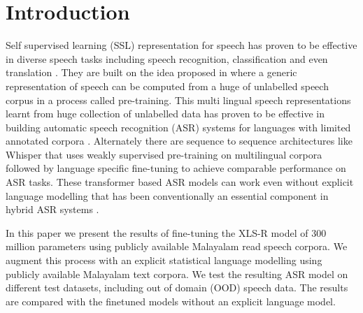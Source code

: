 \documentclass[runningheads]{llncs}
\begin{document}
\section{Introduction}

Self supervised learning (SSL)  representation for speech has proven to be effective in diverse speech tasks including speech recognition, classification and even translation \cite{baevski2020wav2vec,babu2021xls,barrault2023seamlessm4t}.  They are built on the idea proposed in \cite{schneider2019wav2vec} where a generic representation of speech can be computed from a huge of unlabelled speech corpus in a process called pre-training. This multi lingual speech representations learnt from huge collection of unlabelled data has proven to be effective in building automatic speech recognition (ASR) systems for languages with limited annotated corpora \cite{conneau2020unsupervised}. Alternately there are sequence to sequence architectures like Whisper \cite{whisper} that uses weakly supervised pre-training on multilingual corpora followed by language specific fine-tuning to achieve comparable performance on ASR tasks. These transformer based ASR models can work even without explicit language modelling that has been conventionally an essential component in hybrid ASR systems \cite{manohar2023automatic}.

In this paper we present the results of fine-tuning the XLS-R model \cite{babu2021xls} of 300 million parameters using publicly available Malayalam read speech corpora. We augment this process with an explicit statistical language modelling using publicly available Malayalam text corpora. We test the resulting ASR model on different test datasets, including out of domain (OOD) speech data. The results are compared with the finetuned models without an explicit language model.





\end{document}
